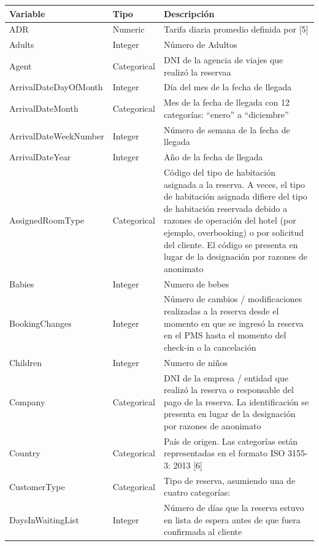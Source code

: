 \documentclass[
]{article}
\begin{document}
\begin{longtable}[]{@{}
  >{\centering\arraybackslash}p{}
  >{\centering\arraybackslash}p{}
  >{\centering\arraybackslash}p{}@{}}
\toprule
Variable & Tipo & Descripción \\
\midrule
\endhead
ADR & Numeric & Tarifa diaria promedio definida por {[}5{]} \\
Adults & Integer & Número de Adultos \\
Agent & Categorical & DNI de la agencia de viajes que realizó la
reservaa \\
ArrivalDateDayOfMonth & Integer & Día del mes de la fecha de llegada \\
ArrivalDateMonth & Categorical & Mes de la fecha de llegada con 12
categorías: ``enero'' a ``diciembre'' \\
ArrivalDateWeekNumber & Integer & Número de semana de la fecha de
llegada \\
ArrivalDateYear & Integer & Año de la fecha de llegada \\
AssignedRoomType & Categorical & Código del tipo de habitación asignada
a la reserva. A veces, el tipo de habitación asignada difiere del tipo
de habitación reservada debido a razones de operación del hotel (por
ejemplo, overbooking) o por solicitud del cliente. El código se presenta
en lugar de la designación por razones de anonimato \\
Babies & Integer & Numero de bebes \\
BookingChanges & Integer & Número de cambios / modificaciones realizadas
a la reserva desde el momento en que se ingresó la reserva en el PMS
hasta el momento del check-in o la cancelación \\
Children & Integer & Numero de niños \\
Company & Categorical & DNI de la empresa / entidad que realizó la
reserva o responsable del pago de la reserva. La identificación se
presenta en lugar de la designación por razones de anonimato \\
Country & Categorical & País de origen. Las categorías están
representadas en el formato ISO 3155-3: 2013 {[}6{]} \\
CustomerType & Categorical & Tipo de reserva, asumiendo una de cuatro
categorías: \\
DaysInWaitingList & Integer & Número de días que la reserva estuvo en
lista de espera antes de que fuera confirmada al cliente \\

\end{longtable}
\end{document}

